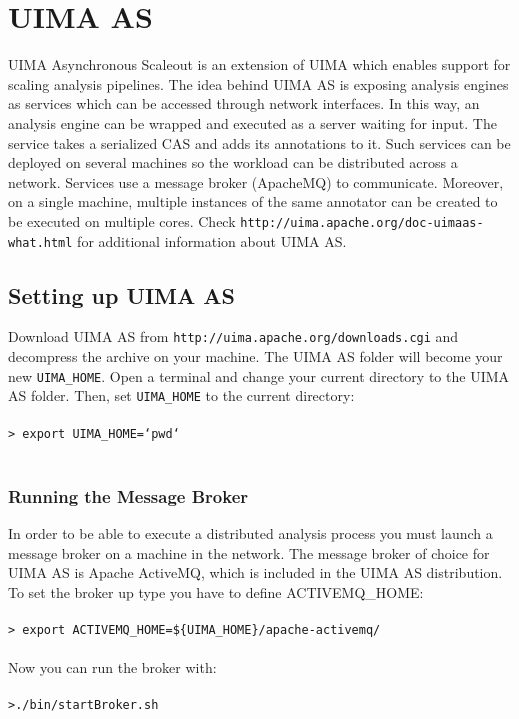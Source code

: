 \documentclass{wileysev}
\begin{document}
\chapter[UIMA AS]{UIMA AS}

UIMA Asynchronous Scaleout is an extension of UIMA which enables support for scaling analysis pipelines. The idea behind UIMA AS is exposing analysis engines as services which can be accessed through network interfaces. In this way, an analysis engine can be wrapped and executed as a server waiting for input. The service takes a serialized CAS and adds its annotations to it. Such services can be deployed on several machines so the workload can be distributed across a network. Services use a message broker (ApacheMQ) to communicate. Moreover, on a single machine, multiple instances of the same annotator can be created to be executed on multiple cores. Check \texttt{http://uima.apache.org/doc-uimaas-what.html} for additional information about UIMA AS.

\section[Setting up UIMA AS]{Setting up UIMA AS}

Download UIMA AS from \texttt{http://uima.apache.org/downloads.cgi} and decompress the archive on your machine. The UIMA AS folder will become your new \texttt{UIMA\_HOME}. Open a terminal and change your current directory to the UIMA AS folder. Then, set \texttt{UIMA\_HOME} to the current directory:
\\\\
\texttt{> export UIMA\_HOME=`pwd`}
\\\\
\subsection{Running the Message Broker}
In order to be able to execute a distributed analysis process you must launch a message broker on a machine in the network. The message broker of choice for UIMA AS is Apache ActiveMQ, which is included in the UIMA AS distribution. To set the broker up type you have to define ACTIVEMQ\_HOME:
\\\\
\texttt{> export ACTIVEMQ\_HOME=\$\{UIMA\_HOME\}/apache-activemq/}
\\\\
Now you can run the broker with:
\\\\
\texttt{>./bin/startBroker.sh}
\end{document}
